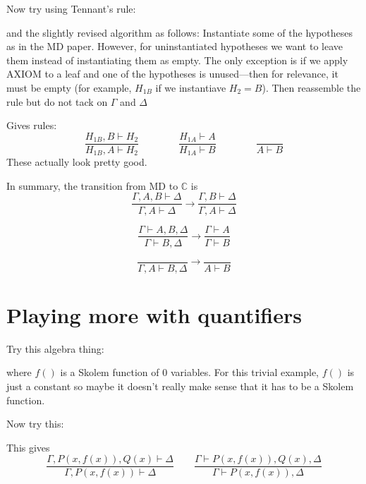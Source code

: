 \documentclass[12pt]{article}
\begin{document}
Now try using Tennant's rule:
\begin{prooftree}
\end{prooftree}
and the slightly revised algorithm as follows: Instantiate some of the
hypotheses as in the MD paper. However, for uninstantiated hypotheses we want to
leave them instead of instantiating them as empty. The only exception is if we
apply AXIOM to a leaf and one of the hypotheses is unused---then for relevance,
it must be empty (for example, $H_{1B}$ if we instantiave $H_2=B$). Then
reassemble the rule but do not tack on $\Gamma$ and $\Delta$

Gives rules:
\[
    \frac{H_{1B},B\vdash H_2}{H_{1B},A\vdash H_2}
    \quad\quad\quad\quad
    \frac{H_{1A}\vdash A}{H_{1A}\vdash B}
    \quad\quad\quad\quad
    \frac{}{A\vdash B}
\]
These actually look pretty good.

In summary, the transition from MD to $\mathbb{C}$ is
\[
\frac{\Gamma,A,B\vdash\Delta}{\Gamma,A\vdash\Delta}\longrightarrow
    \frac{\Gamma,B\vdash \Delta}{\Gamma,A\vdash \Delta}
\]

\[
\frac{\Gamma\vdash A,B,\Delta}{\Gamma\vdash B,\Delta}\longrightarrow
    \frac{\Gamma\vdash A}{\Gamma\vdash B}
\]

\[
\frac{}{\Gamma,A\vdash B,\Delta}\longrightarrow
\frac{}{A\vdash B}
\]

\section{Playing more with quantifiers}

Try this algebra thing:
\begin{prooftree}
\end{prooftree} 
where $f()$ is a Skolem function of 0 variables. For this trivial example, $f()$
is just a constant so maybe it doesn't really make sense that it has to be a
Skolem function.

Now try this:
\begin{prooftree}
\end{prooftree}
This gives
\[
    \frac{\Gamma,P(x,f(x)),Q(x)\vdash\Delta}{\Gamma,P(x,f(x))\vdash\Delta}
    \quad\quad
    \frac{\Gamma\vdash P(x,f(x)),Q(x),\Delta}{\Gamma\vdash P(x,f(x)),\Delta}
\]
\end{document}
